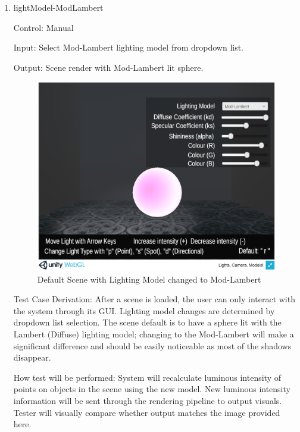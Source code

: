 \documentclass[12pt, titlepage]{article}
\begin{document}
\begin{enumerate}

	\item{lightModel-ModLambert\\}

	Control: Manual
	
	Input: Select Mod-Lambert lighting model from dropdown list.
	
	Output: Scene render with Mod-Lambert lit sphere.
	
	\begin{figure}[h]
		\centering
		\includegraphics[scale=0.25]{./images/sphere-lit-modlambert}
		\caption{Default Scene with Lighting Model changed to Mod-Lambert}
		\label{fig:modLambert}
	\end{figure}
	
	Test Case Derivation: After a scene is loaded, the user can only interact 
	with the system through its GUI. Lighting model changes are determined by 
	dropdown list selection. The scene default is to have a sphere lit with the 
	Lambert (Diffuse) lighting model; changing to the Mod-Lambert will make a 
	significant difference and should be easily noticeable as most of the 
	shadows disappear.
	
	How test will be performed: System will recalculate luminous intensity of 
	points on objects in the scene using the new model. New luminous intensity 
	information will be sent through the rendering pipeline to output        
	visuals. Tester will visually compare whether output matches the image 
	provided here.
	

\end{enumerate}
\end{document}
